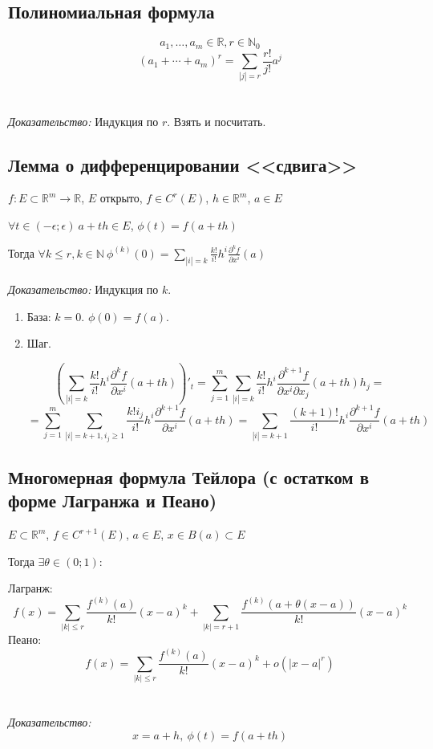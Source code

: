 \documentclass[paper=a4, fontsize=11pt]{article}
\begin{document}
\subsection{Полиномиальная формула}
$$a_1,\dots,a_m \in \mathds{R},r \in \mathds{N}_0$$
$$(a_1+\cdots+a_m)^r = \sum_{|j|=r} \frac{r!}{j!}a^j$$
\\\\
\emph{Доказательство:}
Индукция по $r$. Взять и посчитать.

\subsection{Лемма о дифференцировании <<сдвига>>}
$f: E \subset \mathds{R}^m \rightarrow \mathds{R}$, $E$ открыто, $f \in C^r(E)$, $h \in \mathds{R}^m$, $a \in E$

$\forall t \in (-\epsilon;\epsilon)\ a+th \in E$, $\phi(t) = f(a+th)$

Тогда $\forall k \leq r,k \in \mathds{N}\ \phi^{(k)}(0) = \sum_{|i|=k} \frac{k!}{i!} h^i \frac{\partial^k f}{\partial x^i}(a)$
\\\\
\emph{Доказательство:}
Индукция по $k$.
\begin{enumerate}
    \item База: $k=0$. $\phi(0) = f(a)$.
    \item Шаг.

    $$(\sum_{|i|=k} \frac{k!}{i!} h^i \frac{\partial^k f}{\partial x^i}(a+th))'_t =
    \sum_{j=1}^m \sum_{|i|=k} \frac{k!}{i!} h^i \frac{\partial^{k+1} f}{\partial x^i \partial x_j}(a+th) h_j =$$
    $$=\sum_{j=1}^m \sum_{|i|=k+1, i_j \geq 1} \frac{k!i_j}{i!} h^i \frac{\partial^{k+1} f}{\partial x^i}(a+th) =
    \sum_{|i|=k+1} \frac{(k+1)!}{i!} h^i \frac{\partial^{k+1} f}{\partial x^i}(a+th)$$
\end{enumerate}

\subsection{Многомерная формула Тейлора (с остатком в форме Лагранжа и Пеано)}
$E \subset \mathds{R}^m$, $f \in C^{r+1}(E)$, $a \in E$, $x \in B(a) \subset E$

Тогда $\exists \theta \in (0;1)$:

Лагранж:
$$f(x) = \sum_{|k| \leq r} \frac{f^{(k)}(a)}{k!} (x-a)^k + \sum_{|k|=r+1} \frac{f^{(k)}(a+\theta (x-a))}{k!} (x-a)^k$$
Пеано:
$$f(x) = \sum_{|k| \leq r} \frac{f^{(k)}(a)}{k!} (x-a)^k + o(|x-a|^r)$$
\\\\
\emph{Доказательство:}
$$x = a + h,\ \phi(t) = f(a + th)$$
\end{document}
